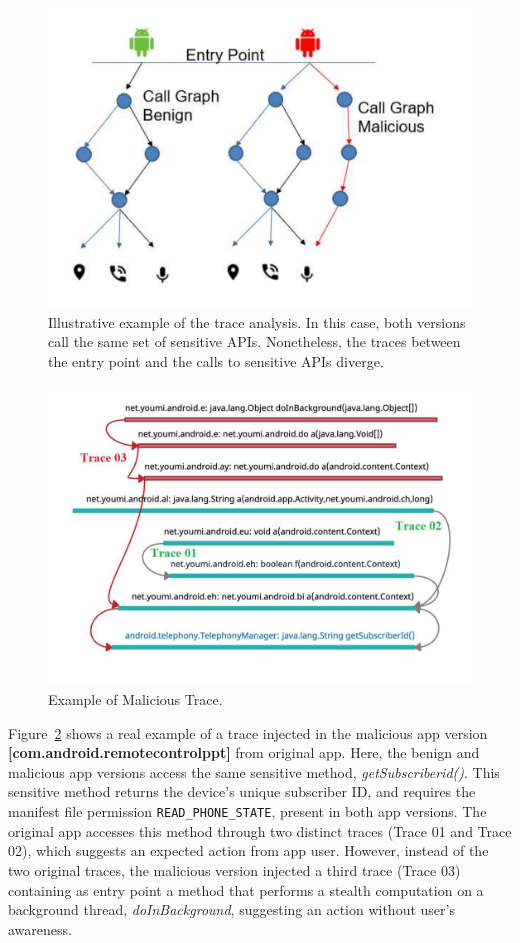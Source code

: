 \begin{figure}[ht]
\centering
\includegraphics[scale=0.30]{images/maliciousCallGraph.pdf}
\caption{Illustrative example of the trace analysis. In this case, both versions call the same set of sensitive APIs. Nonetheless,
the traces between the entry point and the calls to sensitive APIs diverge.}
 \label{fig:callGraph}
\end{figure}

\begin{figure}
\centering
\includegraphics[scale=0.28]{images/maliciousTrace_example01.pdf}
\caption{Example of Malicious Trace.}
 \label{fig:maliciousTrace}
\end{figure}


Figure~\ref{fig:maliciousTrace} shows a real example of a trace injected in the malicious app version \textbf{[com.android.remotecontrolppt]} from original app. Here, the benign and malicious app versions access the same
sensitive method, \textit{getSubscriberid()}. This sensitive method returns the device's unique
subscriber ID, and requires the manifest file permission \texttt{READ\_PHONE\_STATE}, present in both app versions.
The original app accesses this method through two distinct traces (Trace 01 and Trace 02), which suggests an expected action from app user. However,
instead of the two original traces, the malicious version injected a third trace (Trace 03) containing as entry point a method that performs a stealth
computation on a background thread, \textit{doInBackground}, suggesting an action without user's awareness.

